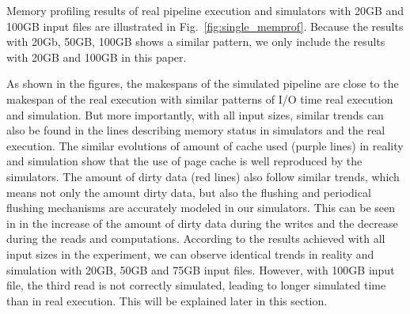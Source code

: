 \documentclass[conference]{IEEEtran}
\begin{document}
            Memory profiling results of real pipeline execution and simulators 
            with 20GB and 100GB input files are illustrated in Fig.~\ref{fig:single_memprof}.
            Because the results with 20Gb, 50GB, 100GB shows a similar pattern,
            we only include the results with 20GB and 100GB in this paper.

            As shown in the figures, the makespans of the simulated pipeline are
            close to the makespan of the real execution with similar patterns of I/O time
            real execution and simulation.
            But more importantly, with all input sizes, similar trends can also be found
            in the lines describing memory status in simulators and the real execution.
            The similar evolutions of amount of cache used (purple lines) in reality
            and simulation show that the use of page cache is well reproduced by the simulators.
            The amount of dirty data (red lines) also follow similar trends,
            which means not only the amount dirty data, but also the flushing and
            periodical flushing mechanisms are accurately modeled in our simulators.
            This can be seen in in the increase of the amount of dirty data during the writes
            and the decrease during the reads and computations.
            According to the results achieved with all input sizes in the experiment,
            we can observe identical trends in reality and simulation with 20GB,
            50GB and 75GB input files. However, with 100GB input file,
            the third read is not correctly simulated, leading to longer simulated time
            than in real execution. This will be explained later in this section.
\end{document}
